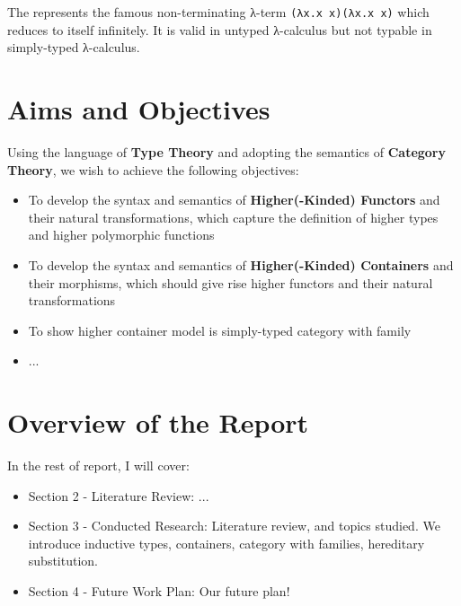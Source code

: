 The  represents the famous non-terminating λ-term \texttt{(λx.x x)(λx.x x)} which reduces to itself infinitely. It is valid in untyped λ-calculus but not typable in simply-typed λ-calculus. 

\section{Aims and Objectives}

Using the language of \textbf{Type Theory} and adopting the semantics of \textbf{Category Theory}, we wish to achieve the following objectives:

\begin{itemize}
  \item{To develop the syntax and semantics of \textbf{Higher(-Kinded) Functors} and their natural transformations, which capture the definition of higher types and higher polymorphic functions}
  \item{To develop the syntax and semantics of \textbf{Higher(-Kinded) Containers} and their morphisms, which should give rise higher functors and their natural transformations}
  \item{To show higher container model is simply-typed category with family}
  \item{...}
\end{itemize}

\section{Overview of the Report}

In the rest of report, I will cover:
\begin{itemize}
  \item{Section 2 - Literature Review: ...}
  \item{Section 3 - Conducted Research: Literature review, and topics studied. We introduce inductive types, containers, category with families, hereditary substitution.}
  \item{Section 4 - Future Work Plan: Our future plan!}
\end{itemize}

